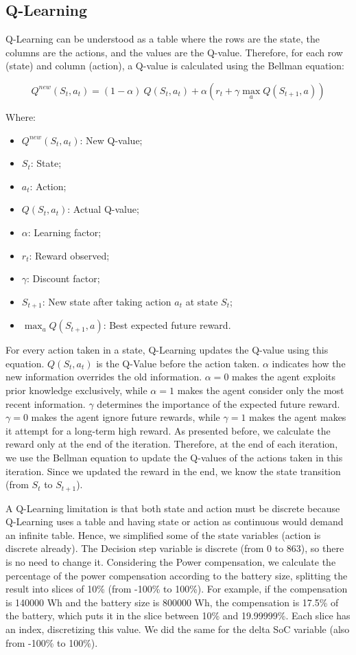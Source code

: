 \subsection{Q-Learning}
Q-Learning can be understood as a table where the rows are the state, the columns are the actions, and the values are the Q-value. Therefore, for each row (state) and column (action), a Q-value is calculated using the Bellman equation:

\begin{equation}
    Q^{new}(S_t, a_t) = (1 - \alpha)\ Q(S_t, a_t) + \alpha (r_t + \gamma \max_a Q(S_{t+1}, a) )
\end{equation}

Where:
\begin{itemize}
    \item $Q^{new}(S_t, a_t)$: New Q-value;
    \item $S_t$: State;
    \item $a_t$: Action;
    \item $Q(S_t, a_t)$: Actual Q-value;
    \item $\alpha$: Learning factor;
    \item $r_t$: Reward observed;
    \item $\gamma$: Discount factor;
    \item $S_{t+1}$: New state after taking action $a_t$ at state $S_t$;
    \item $\max_a Q(S_{t+1}, a)$: Best expected future reward.
\end{itemize}

For every action taken in a state, Q-Learning updates the Q-value using this equation. $Q(S_t, a_t)$ is the Q-Value before the action taken. $\alpha$ indicates how the new information overrides the old information. $\alpha = 0$ makes the agent exploits prior knowledge exclusively, while $\alpha = 1$ makes the agent consider only the most recent information. $\gamma$ determines the importance of the expected future reward. $\gamma = 0$ makes the agent ignore future rewards, while $\gamma = 1$ makes the agent makes it attempt for a long-term high reward. As presented before, we calculate the reward only at the end of the iteration. Therefore, at the end of each iteration, we use the Bellman equation to update the Q-values of the actions taken in this iteration. Since we updated the reward in the end, we know the state transition (from $S_{t}$ to $S_{t+1}$).

A Q-Learning limitation is that both state and action must be discrete because Q-Learning uses a table and having state or action as continuous would demand an infinite table. Hence, we simplified some of the state variables (action is discrete already). The Decision step variable is discrete (from 0 to 863), so there is no need to change it. Considering the Power compensation, we calculate the percentage of the power compensation according to the battery size, splitting the result into slices of 10\% (from -100\% to 100\%). For example, if the compensation is 140000 Wh and the battery size is 800000 Wh, the compensation is 17.5\% of the battery, which puts it in the slice between 10\% and 19.99999\%. Each slice has an index, discretizing this value. We did the same for the delta SoC variable (also from -100\% to 100\%).

